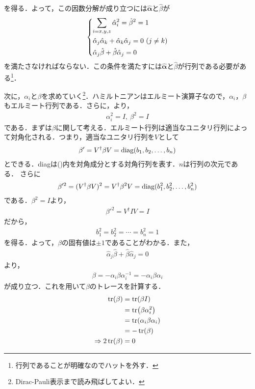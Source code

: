 \documentclass{report}
\begin{document}
を得る．よって，この因数分解が成り立つには$\bm{\hat{\alpha}}$と$\hat{\beta}$が
\begin{align}
  \label{conditons-of-coefficients-of-dirac}
  \begin{dcases}
    \sum_{i=x,y,z} \hat{\alpha}_i^2 = \hat{\beta}^2 = 1\\
    \hat{\alpha}_j \hat{\alpha}_k + \hat{\alpha}_k \hat{\alpha}_j = 0\ (j \neq k)\\
    \hat{\alpha}_j \hat{\beta} + \hat{\beta} \hat{\alpha}_j = 0
  \end{dcases}
\end{align}
を満たさなければならない．この条件を満たすには$\bm{\hat{\alpha}}$と$\hat{\beta}$が行列である必要がある\footnote{行列であることが明確なのでハットを外す．}．

次に，$\alpha_i$と$\beta$を求めていく\footnote{Dirac-Pauli表示まで読み飛ばしてよい．}．ハミルトニアンはエルミート演算子なので，$\alpha_i$，$\beta$もエルミート行列である．さらに，より，
\begin{align}
  \alpha_i^2 = I,\ \beta^2 = I
\end{align}
である．まずは$\beta$に関して考える．エルミート行列は適当なユニタリ行列によって対角化される．つまり，適当なユニタリ行列を$V$として
\begin{align}
  \beta' = V^\dagger \beta V = \mathrm{diag}(b_1, b_2, \dots, b_n)
\end{align}
とできる．diagは()内を対角成分とする対角行列を表す．$n$は行列の次元である．
さらに
\begin{align}
  \beta'^2 = (V^\dagger \beta V)^2 = V^\dagger \beta^2 V = \mathrm{diag}(b_1^2,b_2^2,\dots,b_n^2)
\end{align}
である．$\beta^2 = I$より，
\begin{align}
  \beta'^2 = V^\dagger I V = I
\end{align}
だから，
\begin{align}
  b_1^2 = b_2^2 = \cdots = b_n^2 = 1
\end{align}
を得る．よって，$\beta$の固有値は$\pm1$であることがわかる．また，
\begin{align}
  \hat{\alpha}_j \hat{\beta} + \hat{\beta} \hat{\alpha}_j = 0
\end{align}
より，
\begin{align}
  \beta = - \alpha_i\beta\alpha_i^{-1} = -\alpha_i\beta\alpha_i
\end{align}
が成り立つ．これを用いて$\beta$のトレースを計算する．
\begin{align}
  \tr(\beta) &= \tr(\beta I)\\
  &= \tr(\beta \alpha_i^2)\\
  &= \tr(\alpha_i\beta\alpha_i) \\
  &= -\tr(\beta)\\
  \Rightarrow 2\tr(\beta) &= 0
\end{align}
\end{document}
